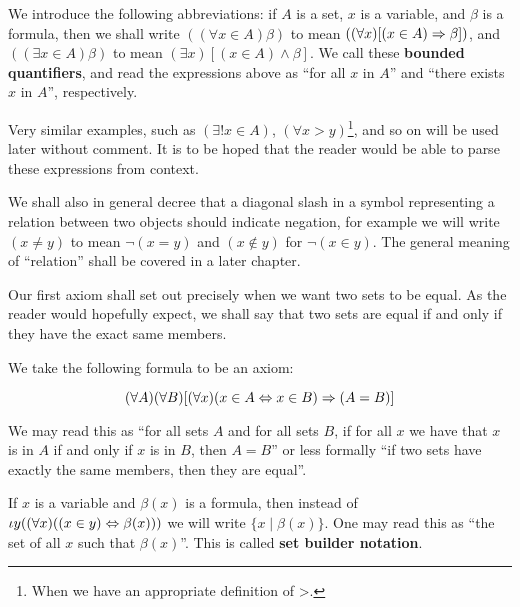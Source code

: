 \begin{defn}
\label{Defn: Bounded Quantifiers}
We introduce the following abbreviations: if $A$ is a set, $x$ is a variable, and $\beta$ is a formula, then we shall write $((\forall x\in A)\beta)$ to mean $((\forall x)[(x\in A) \Rightarrow \beta])$, and $((\exists x\in A)\beta)$ to mean $(\exists x)[(x\in A) \land \beta]$. We call these \textbf{bounded quantifiers}, and read the expressions above as \enquote{for all $x$ in $A$} and \enquote{there exists $x$ in $A$}, respectively. 

Very similar examples, such as $(\exists ! x\in A)$, $(\forall x > y)$\footnote{When we have an appropriate definition of >.}, and so on will be used later without comment. It is to be hoped that the reader would be able to parse these expressions from context.

We shall also in general decree that a diagonal slash in a symbol representing a relation between two objects should indicate negation, for example we will write $(x\neq y)$ to mean $\lnot(x=y)$ and $(x\notin y)$ for $\lnot(x\in y)$. The general meaning of \enquote{relation} shall be covered in a later chapter.
\end{defn}

Our first axiom shall set out precisely when we want two sets to be equal. As the reader would hopefully expect, we shall say that two sets are equal if and only if they have the exact same members.

\begin{axm} 
\label{Axiom: Extensionality} 
We take the following formula to be an axiom: 

\begin{displaymath}
(\forall A)(\forall B)[(\forall x)(x\in A \Leftrightarrow x \in B) \Rightarrow (A=B)]
\end{displaymath}

We may read this as \enquote{for all sets $A$ and for all sets $B$, if for all $x$ we have that $x$ is in $A$ if and only if $x$ is in $B$, then $A = B$} or less formally \enquote{if two sets have exactly the same members, then they are equal}.
\end{axm}

\begin{convention}
\label{Conv: Set Builder Notation}
If $x$ is a variable and $\beta(x)$ is a formula, then instead of $\iota y ((\forall x)((x\in y)\Leftrightarrow\beta(x)))$ we will write $\{x \mid \beta(x)\}$. One may read this as \enquote{the set of all $x$ such that $\beta(x)$}. This is called \textbf{set builder notation}.
\end{convention}

